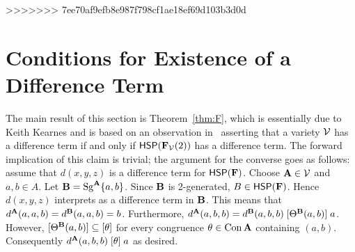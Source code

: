 >>>>>>> 7ee70af9efb8e987f798cf1ae18ef69d103b3d0d



\section{Conditions for Existence of a Difference Term}
\label{sec:equiv-cond-exist}
The main result of this section is Theorem~\ref{thm:F}, which 
is essentially due to Keith Kearnes and is based on an observation
in~\cite{MR1358491}
asserting that a variety $\mathcal{V}$ has a difference term if and only if
$\mathsf{H} \mathsf{S} \mathsf{P}(\mathbf{F}_{\mathcal{V}}(2))$ 
has a difference term.
The forward implication of this claim is trivial;
the argument for the converse goes as follows:
assume that $d(x, y, z)$ is a difference term for $\mathsf{H} \mathsf{S} \mathsf{P}(\mathbf{F})$.
Choose $\mathbf{A} \in \mathcal{V}$ and $a, b \in A$. Let $\mathbf{B} = \operatorname{Sg}^{\mathbf{A}} \{a, b\}$.
Since $\mathbf{B}$ is 2-generated, $B \in \mathsf{H} \mathsf{S} \mathsf{P} (\mathbf{F})$.
Hence $d(x, y, z)$ interprets as a difference term in $\mathbf{B}$. This means that
$d^{\mathbf{A}} (a, a, b) = d^{\mathbf{B}} (a, a, b) = b$.
Furthermore,
$d^{\mathbf{A}} (a, b, b) = d^{\mathbf{B}} (a, b, b)
\mathrel{[\Theta^{\mathbf{B}} (a, b)]} a$.
However, 
$[\Theta^{\mathbf{B}} (a, b)] \subseteq [\theta]$
for every congruence
$\theta \in \operatorname{Con} \mathbf{A}$ containing $(a, b)$. Consequently
$d^{\mathbf{A}} (a, b, b)
\mathrel{[\theta]}
a$ as desired.

